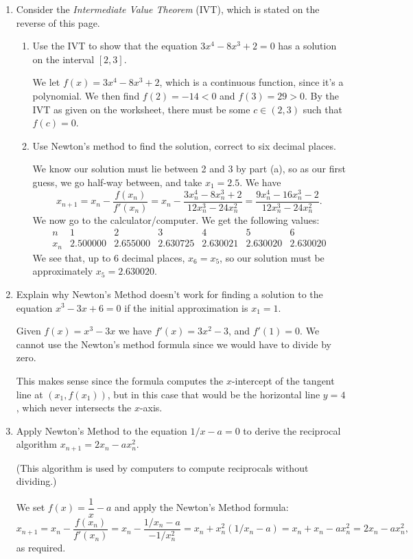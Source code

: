 \documentclass[12pt]{article}
\begin{document}
\begin{enumerate}
\item Consider the \textit{Intermediate Value Theorem} (IVT), which is stated on the reverse of this page.
\begin{enumerate}
\item Use the IVT to show that the equation $3x^4-8x^3+2=0$ has a solution on the interval $[2,3]$.

We let $f(x)=3x^4-8x^3+2$, which is a continuous function, since it's a polynomial. We then find $f(2) = -14<0$ and $f(3)=29>0$. By the IVT as given on the worksheet, there must be some $c\in (2,3)$ such that $f(c)=0$.

\item Use Newton's method to find the solution, correct to six decimal places.

We know our solution must lie between 2 and 3 by part (a), so as our first guess, we go half-way between, and take $x_1=2.5$. We have
\[
x_{n+1}=x_n-\frac{f(x_n)}{f'(x_n)} = x_n-\frac{3x_n^4-8x_n^3+2}{12x_n^3-24x_n^2} = \frac{9x_n^4-16x_n^3-2}{12x_n^3-24x_n^2}.
\]
We now go to the calculator/computer. We get the following values:
\[
\begin{array}{c|cccccc}
n&1&2&3&4&5&6\\
x_n&2.500000&2.655000&2.630725&2.630021&2.630020&2.630020
\end{array}
\]
We see that, up to 6 decimal places, $x_6=x_5$, so our solution must be approximately $x_5=2.630020$.

\end{enumerate}



\item Explain why Newton's Method doesn't work for finding a solution to the equation $x^3-3x+6=0$ if the initial approximation is $x_1=1$.

Given $f(x)=x^3-3x$ we have $f'(x)=3x^2-3$, and $f'(1)=0$. We cannot use the Newton's method formula since we would have to divide by zero.

This makes sense since the formula computes the $x$-intercept of the tangent line at $(x_1,f(x_1))$, but in this case that would be the horizontal line $y=4$, which never intersects the $x$-axis.

\item Apply Newton's Method to the equation $1/x - a=0$ to derive the reciprocal algorithm $x_{n+1}=2x_n-ax_n^2$.

(This algorithm is used by computers to compute reciprocals without dividing.)

We set $f(x)=\dfrac1x-a$ and apply the Newton's Method formula:
\[
x_{n+1} = x_n-\frac{f(x_n)}{f'(x_n)}=x_n-\frac{1/x_n-a}{-1/x_n^2}=x_n+x_n^2(1/x_n-a)=x_n+x_n-ax_n^2=2x_n-ax_n^2,
\]
as required.
\end{enumerate}
\end{document}
